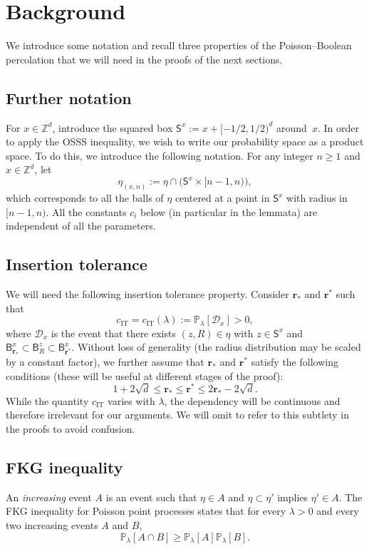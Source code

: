 \documentclass[AHL,Unicode,longabstracts]{cedram}
\newcommand{\rbf}{\mathbf{r}}
\DeclareMathOperator{\IT}{IT}
\begin{document}
\section{Background}\label{sect2}
We introduce some notation and recall three properties of the Poisson--Boolean percolation that we will need in the proofs of the next sections.
\subsection{Further notation}
For $x\in {\mathbb Z}^d$, introduce the squared box $\mathsf S^{x}:= x+[-1/2,1/2)^d$ around~$x$. In order to apply the OSSS inequality, we wish to write our probability space as a product space. To do this, we introduce the following notation. For any integer $n\ge1$ and $x\in {\mathbb Z}^d$, let
\[
\eta_{(x,n)} := \eta\cap \big(\mathsf S^x\times [n-1,n)\big),
\]
which corresponds to all the balls of $\eta$ centered at a point in $\mathsf S^x$ with radius in $[n-1,n)$. All the constants $c_i$ below (in particular in the lemmata) are independent of all the parameters.



\subsection{Insertion tolerance}
We will need the following insertion tolerance property. Consider ${\rbf_*}$ and ${\rbf^*}$ such that
\begin{equation}\label{eq:radass}
\tag{IT}
c_{\IT}=c_{\IT}(\lambda):={\mathbb P}_\lambda[{\mathcal D}_x]>0,
\end{equation}
where ${\mathcal D}_x$ is the event that there exists $(z,R)\in \eta$ with $z\in\mathsf S^x$ and $\mathsf B_{\rbf_*}^x\subset \mathsf B_R^z\subset \mathsf B_{\rbf^*}^x$. Without loss of generality (the radius distribution may be scaled by a constant factor), we further assume that ${\rbf_*}$ and ${\rbf^*}$ satisfy the following conditions (these will be useful at different stages of the proof):
\begin{equation}\label{eq:rass}
1+2\sqrt d\le {\rbf_*}\le{\rbf^*}\le 2{\rbf_*}-2\sqrt d.
\end{equation}
While the quantity $c_{\IT}$ varies with $\lambda$, the dependency will be continuous and therefore irrelevant for our arguments. We will omit to refer to this subtlety in the proofs to avoid confusion.
\subsection{FKG inequality}
An \emph{increasing} event $A$ is an event such that $\eta\in A$ and $\eta\subset\eta'$ implies $\eta'\in A$. The FKG inequality for Poisson point processes states that for every $\lambda>0$ and every two increasing events $A$ and $B$,
\begin{equation}\label{eq:FKG}
\tag{FKG}
{\mathbb P}_\lambda[A\cap B]\ge {\mathbb P}_\lambda[A]{\mathbb P}_\lambda[B].
\end{equation}
\end{document}
